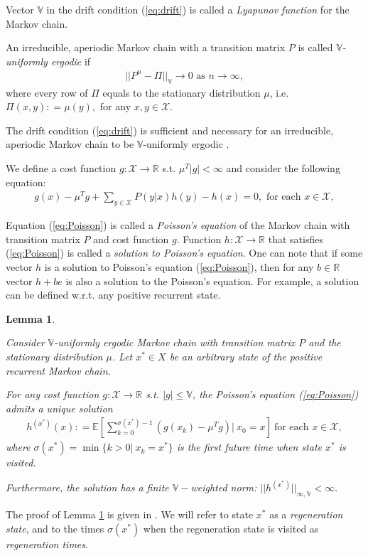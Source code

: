 \documentclass[11pt]{article}
\newcommand{\R}{\mathbb{R}}
\newcommand{\E}{\mathbb{E}}
\newcommand{\X}{\mathcal{X}}
\newcommand{\V}{\mathbb{V}}
\newtheorem{lemma}{Lemma}
\theoremstyle{definition}
\numberwithin{equation}{section}
\begin{document}
 Vector $\V$ in the drift condition (\ref{eq:drift}) is called a \textit{Lyapunov function} for the Markov chain.



An irreducible, aperiodic Markov chain with a transition matrix  $P$ is called   \textit{$\V$-uniformly ergodic} if 
\begin{align*}||P^n - \Pi||_\V\rightarrow 0 \text{ as } n\rightarrow \infty,\end{align*} 
where every row of $ \Pi$ equals to the stationary distribution $\mu$, i.e. $\Pi(x, y): = \mu(y),$ for any $x, y\in \X.$
 


The drift condition (\ref{eq:drift}) is sufficient and necessary for an irreducible, aperiodic Markov chain  to be $\V$-uniformly ergodic \cite[Theorem 16.0.1]{Meyn2009}.

We define a cost function $g:\X \rightarrow \R$ s.t. $\mu^T |g|<\infty$ and consider the following equation:
\begin{align}\label{eq:Poisson}
g(x) - \mu^T g + \sum\limits_{y\in \X}P(y|x) h(y) - h(x) =0, \text{ for each }x\in \X,
\end{align}

Equation (\ref{eq:Poisson}) is called a \textit{Poisson's equation} of the Markov chain with transition matrix $P$ and cost function $g $. Function $h:\X\rightarrow \R$ that satisfies (\ref{eq:Poisson}) is called a \textit{solution to Poisson's equation}.  One can note that if some vector $h$ is a solution to Poisson's equation (\ref{eq:Poisson}), then for any $b\in \R$ vector $h+be$ is also a  solution to the Poisson's equation.  For example, a  solution can be defined w.r.t. any positive recurrent state. 



\begin{lemma}\label{lem:poisson_sol2}

Consider $\V$-uniformly ergodic  Markov chain with transition matrix $P$ and the stationary  distribution $\mu$. Let $x^*\in X$ be an arbitrary state of the positive recurrent Markov chain. 

 For any cost function $g:\X \rightarrow \R$ s.t. $|g|\leq \V$, the Poisson's equation (\ref{eq:Poisson}) admits a unique solution 
\begin{align}\label{eq:h2}
h^{(x^*)}(x) : = \E \left[\sum\limits_{k=0}^{\sigma(x^*)-1} \left(g(x_k) - \mu^Tg\right)\Big|~x_0 = x\right] ~\text{for each }x\in \X,
\end{align}
where $\sigma(x^*) = \min\{k>0|~x_k = x^*\}$ is the first future time when state $x^*$ is visited. 
 
 Furthermore, the solution has a finite $\V-$weighted norm: $||h^{(x^*)}||_{\infty, \V}<\infty.$
\end{lemma}
The  proof of Lemma \ref{lem:poisson_sol2} is given in \cite[Proposition A.3.1]{Meyn2007}.  We will  refer to state $x^*$ as a \textit{regeneration state}, and to the times $\sigma(x^*)$ when the regeneration state is visited   as \textit{regeneration times}. 
\end{document}
